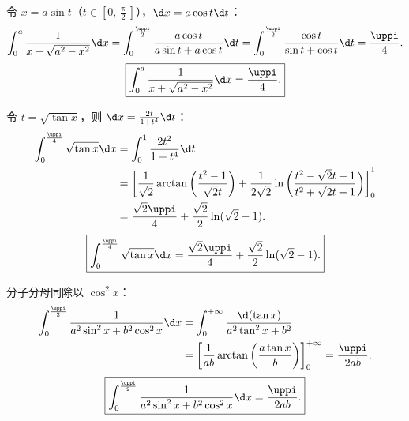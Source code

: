\begin{solution}

    令 $x = a \sin t$（$t \in \left[0, \frac{\uppi}{2}\right]$），$\d x = a\cos t \d t$：
    \begin{equation}
        \int_0^a \frac{1}{x + \sqrt{a^2 - x^2}} \d x = \int_0^{\frac{\uppi}{2}} \frac{a\cos t}{a\sin t + a\cos t} \d t = \int_0^{\frac{\uppi}{2}} \frac{\cos t}{\sin t + \cos t} \d t = \frac{\uppi}{4}.
    \end{equation}
    \begin{equation}
        \boxed{\int_0^a \frac{1}{x + \sqrt{a^2 - x^2}} \d x = \frac{\uppi}{4}.}
    \end{equation}


    令 $t = \sqrt{\tan x}$，则 $\d x = \frac{2t}{1 + t^4}\d t$：
    \begin{equation}
        \begin{aligned}
            \int_0^{\frac{\uppi}{4}} \sqrt{\tan x} \d x & = \int_0^1 \frac{2t^2}{1 + t^4} \d t                                                                                                                                          \\
                                                        & = \left[ \frac{1}{\sqrt{2}}\arctan\left( \frac{t^2 - 1}{\sqrt{2}t} \right) + \frac{1}{2\sqrt{2}}\ln\left( \frac{t^2 - \sqrt{2}t + 1}{t^2 + \sqrt{2}t + 1} \right) \right]_0^1 \\
                                                        & = \frac{\sqrt{2}\uppi}{4} + \frac{\sqrt{2}}{2}\ln(\sqrt{2} - 1).
        \end{aligned}
    \end{equation}
    \begin{equation}
        \boxed{\int_0^{\frac{\uppi}{4}} \sqrt{\tan x} \d x = \frac{\sqrt{2}\uppi}{4} + \frac{\sqrt{2}}{2}\ln(\sqrt{2} - 1).}
    \end{equation}


    分子分母同除以 $\cos^2 x$：
    \begin{equation}
        \begin{aligned}
            \int_0^{\frac{\uppi}{2}} \frac{1}{a^2 \sin^2 x + b^2 \cos^2 x} \d x & = \int_0^{+\infty} \frac{\d(\tan x)}{a^2 \tan^2 x + b^2}                                              \\
                                                                                & = \left[ \frac{1}{ab}\arctan\left( \frac{a\tan x}{b} \right) \right]_0^{+\infty} = \frac{\uppi}{2ab}.
        \end{aligned}
    \end{equation}
    \begin{equation}
        \boxed{\int_0^{\frac{\uppi}{2}} \frac{1}{a^2 \sin^2 x + b^2 \cos^2 x} \d x = \frac{\uppi}{2ab}.}
    \end{equation}


\end{solution}
